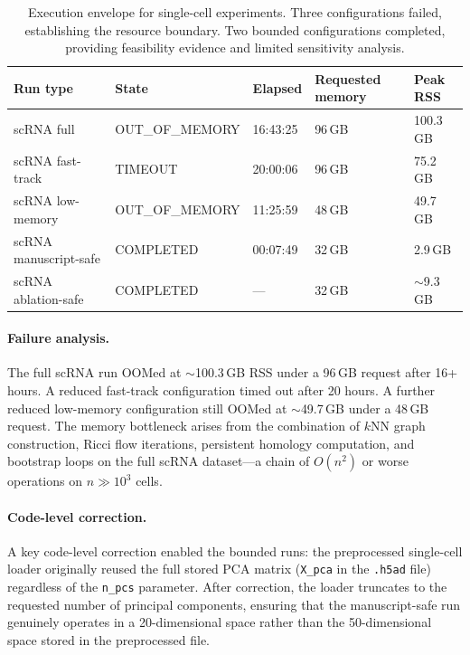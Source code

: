 \documentclass[11pt]{article}
\begin{document}
\begin{table}[h]
\centering
\small
\begin{tabular}{lllll}
\toprule
Run type & State & Elapsed & Requested memory & Peak RSS \\
\midrule
scRNA full & OUT\_OF\_MEMORY & 16:43:25 & 96\,GB & 100.3\,GB \\
scRNA fast-track & TIMEOUT & 20:00:06 & 96\,GB & 75.2\,GB \\
scRNA low-memory & OUT\_OF\_MEMORY & 11:25:59 & 48\,GB & 49.7\,GB \\
scRNA manuscript-safe & COMPLETED & 00:07:49 & 32\,GB & 2.9\,GB \\
scRNA ablation-safe & COMPLETED & --- & 32\,GB & ${\sim}$9.3\,GB \\
\bottomrule
\end{tabular}
\caption{Execution envelope for single-cell experiments.
Three configurations failed, establishing the resource boundary.
Two bounded configurations completed, providing feasibility evidence and limited sensitivity analysis.}
\label{tab:scRNAresource}
\end{table}

\paragraph{Failure analysis.}
The full scRNA run OOMed at ${\sim}$100.3\,GB RSS under a 96\,GB request after 16+ hours.
A reduced fast-track configuration timed out after 20 hours.
A further reduced low-memory configuration still OOMed at ${\sim}$49.7\,GB under a 48\,GB request.
The memory bottleneck arises from the combination of $k$NN graph construction, Ricci flow iterations, persistent homology computation, and bootstrap loops on the full scRNA dataset---a chain of $O(n^2)$ or worse operations on $n \gg 10^3$ cells.

\paragraph{Code-level correction.}
A key code-level correction enabled the bounded runs: the preprocessed single-cell loader originally reused the full stored PCA matrix (\texttt{X\_pca} in the \texttt{.h5ad} file) regardless of the \texttt{n\_pcs} parameter.
After correction, the loader truncates to the requested number of principal components, ensuring that the manuscript-safe run genuinely operates in a 20-dimensional space rather than the 50-dimensional space stored in the preprocessed file.
\end{document}
